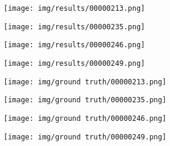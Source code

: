 \documentclass[conference]{IEEEtran}
\begin{document}
    \begin{figure*}[htbp]
        \centering

        \begin{subfigure}[b]{0.22\linewidth}
            \centering
            \texttt{[image: img/results/00000213.png]}
            \caption{}
            \label{res:2:213}
        \end{subfigure}
        \hfill
        \begin{subfigure}[b]{0.22\linewidth}
            \centering
            \texttt{[image: img/results/00000235.png]}
            \caption{}
            \label{res:2:235}
        \end{subfigure}
        \hfill
        \begin{subfigure}[b]{0.22\linewidth}
            \centering
            \texttt{[image: img/results/00000246.png]}
            \caption{}
            \label{res:2:246}
        \end{subfigure}
        \hfill
        \begin{subfigure}[b]{0.22\linewidth}
            \centering
            \texttt{[image: img/results/00000249.png]}
            \caption{}
            \label{res:2:249}
        \end{subfigure}

        \begin{subfigure}[b]{0.22\linewidth}
            \centering
            \texttt{[image: img/ground truth/00000213.png]}
            \caption{}
            \label{res:2:213:gt}
        \end{subfigure}
        \hfill
        \begin{subfigure}[b]{0.22\linewidth}
            \centering
            \texttt{[image: img/ground truth/00000235.png]}
            \caption{}
            \label{res:2:235:gt}
        \end{subfigure}
        \hfill
        \begin{subfigure}[b]{0.22\linewidth}
            \centering
            \texttt{[image: img/ground truth/00000246.png]}
            \caption{}
            \label{res:2:246:gt}
        \end{subfigure}
        \hfill
        \begin{subfigure}[b]{0.22\linewidth}
            \centering
            \texttt{[image: img/ground truth/00000249.png]}
            \caption{}
            \label{res:2:249:gt}
        \end{subfigure}


\end{figure*}
\end{document}
